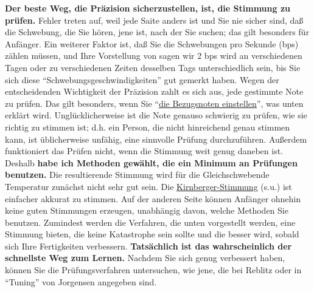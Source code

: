 \textbf{Der beste Weg, die Präzision sicherzustellen, ist, die Stimmung zu prüfen.}
Fehler treten auf, weil jede Saite anders ist und Sie nie sicher sind, daß die Schwebung, die Sie hören, jene ist, nach der Sie suchen; das gilt besonders für Anfänger.
Ein weiterer Faktor ist, daß Sie die Schwebungen pro Sekunde (bps) zählen müssen, und Ihre Vorstellung von sagen wir 2 bps wird an verschiedenen Tagen oder zu verschiedenen Zeiten desselben Tags unterschiedlich sein, bis Sie sich diese \enquote{Schwebungsgeschwindigkeiten} gut gemerkt haben.
Wegen der entscheidenden Wichtigkeit der Präzision zahlt es sich aus, jede gestimmte Note zu prüfen.
Das gilt besonders, wenn Sie \enquote{\hyperlink{c2_6}{die Bezugsnoten einstellen}}, was unten erklärt wird.
Unglücklicherweise ist die Note genauso schwierig zu prüfen, wie sie richtig zu stimmen ist; d.h. ein Person, die nicht hinreichend genau stimmen kann, ist üblicherweise unfähig, eine sinnvolle Prüfung durchzuführen.
Außerdem funktioniert das Prüfen nicht, wenn die Stimmung weit genug daneben ist.
Deshalb \textbf{habe ich Methoden gewählt, die ein Minimum an Prüfungen benutzen.}
Die resultierende Stimmung wird für die Gleichschwebende Temperatur zunächst nicht sehr gut sein.
Die \hyperlink{c2_6_kirn}{Kirnberger-Stimmung} (s.u.) ist einfacher akkurat zu stimmen.
Auf der anderen Seite können Anfänger ohnehin keine guten Stimmungen erzeugen, unabhängig davon, welche Methoden Sie benutzen.
Zumindest werden die Verfahren, die unten vorgestellt werden, eine Stimmung bieten, die keine Katastrophe sein sollte und die besser wird, sobald sich Ihre Fertigkeiten verbessern.
\textbf{Tatsächlich ist das wahrscheinlich der schnellste Weg zum Lernen.}
Nachdem Sie sich genug verbessert haben, können Sie die Prüfungsverfahren untersuchen, wie jene, die bei Reblitz oder in \enquote{Tuning} von Jorgensen angegeben sind.
 


